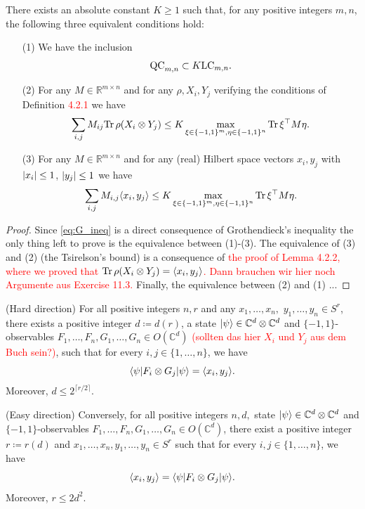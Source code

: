 \begin{theo}
	There exists an absolute constant $K\geq 1$ such that, for any positive integers $m,n$, the following three equivalent conditions hold:
	\begin{itemize}
		\item[(1)] We have the inclusion 
			\begin{equation}
				\textup{QC}_{m,n} \subset K\textup{LC}_{m,n}.
			\end{equation}
		\item[(2)] For any $M\in\mathbb{R}^{m\times n}$ and for any $\rho,X_i,Y_j$ verifying the conditions of Definition \textcolor{red}{4.2.1} we have
			\begin{equation}
				\sum_{i,j} M_{ij} \text{Tr} \, {\rho(X_i\otimes Y_j)} \leq K \max_{\xi\in\{-1,1\}^m,\eta\in\{-1,1\}^n} \text{Tr} \, {\xi^\top M \eta} .
			\end{equation}
			\item[(3)] For any $M\in\mathbb{R}^{m\times n}$ and for any (real) Hilbert space vectors $x_i,y_j$ with ${\left|{x_i}\right|}\leq 1$, ${\left|{y_j}\right|}\leq 1$ we have
				\begin{equation}
					\sum_{i,j} M_{i,j}\langle{x_i},{y_j}\rangle \leq K \max_{\xi\in\{-1,1\}^m,\eta\in\{-1,1\}^n} \text{Tr} \, {\xi^\top M \eta} . \label{eq:G_ineq}
				\end{equation}
	\end{itemize}
\end{theo}
\begin{proof}
	Since \eqref{eq:G_ineq} is a direct consequence of Grothendieck's inequality the only thing left to prove is the equivalence between (1)-(3). The equivalence of (3) and (2) (the Tsirelson's bound) is a consequence of \textcolor{red}{the proof of Lemma \textcolor{red}{4.2.2}, where we proved that $\text{Tr} \, {\rho(X_i\otimes Y_j)}  = \langle{x_i},{y_j}\rangle$.}
	\textcolor{red}{Dann brauchen wir hier noch Argumente aus Exercise 11.3.}
	Finally, the equivalence between (2) and (1) ...
\end{proof}
\begin{theo}[Tsirelson]
	(Hard direction) For all positive integers $n, r$ and any $x_1,\dots,x_n,$ $y_1,\dots,y_n\in S^r$, there exists a positive integer $d\coloneqq d(r)$, a state $\vert {\psi} \rangle\in\mathbb{C}^d\otimes\mathbb{C}^d$ and $\{-1,1\}$-observables $F_1,\dots,F_n,G_1,\dots,G_n\in O(\mathbb{C}^d)$ \textcolor{red}{(sollten das hier $X_i$ und $Y_j$ aus dem Buch sein?)}, such that for every $i,j\in\{1,\dots,n\}$, we have
	\begin{equation}
		\langle {\psi} \vert F_i\otimes G_j \vert {\psi} \rangle = \langle{x_i},{y_j}\rangle.
	\end{equation}
	Moreover, $d\leq 2^{\lceil r/2 \rceil}$.
	
	(Easy direction) Conversely, for all positive integers $n,d,$ state $\vert {\psi} \rangle\in \mathbb{C}^d\otimes\mathbb{C}^d$ and $\{-1,1\}$-observables $F_1,\dots,F_n,G_1,\dots,G_n\in O(\mathbb{C}^d)$, there exist a positive integer $r\coloneqq r(d)$ and $x_1,\dots,x_n,y_1,\dots,y_n\in S^r$ such that for every $i,j\in\{1,\dots,n\}$, we have
	\begin{equation}
		\langle{x_i},{y_j}\rangle = \langle {\psi} \vert F_i\otimes G_j \vert {\psi} \rangle.
	\end{equation}
	Moreover, $r\leq 2d^2$.
\end{theo}
